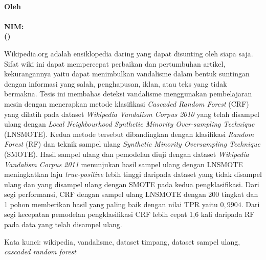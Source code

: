\begin{center}
\textbf{\large
	\MakeUppercase{\judul{}} \\
	\bigskip
	\textnormal{Oleh} \\
	\myname{} \\
	NIM: \mysid{} \\
	(\mydept{}) \\
}
\end{center}

\bigskip
\bigskip
\bigskip

Wikipedia.org adalah ensiklopedia daring yang dapat disunting oleh siapa saja.
Sifat wiki ini dapat mempercepat perbaikan dan pertumbuhan artikel,
kekurangannya yaitu dapat menimbulkan vandalisme dalam bentuk suntingan dengan
informasi yang salah, penghapusan, iklan, atau teks yang tidak bermakna.
Tesis ini membahas deteksi vandalisme menggunakan pembelajaran mesin
dengan menerapkan metode klasifikasi
\textit{Cascaded Random Forest} (CRF)
yang dilatih pada dataset
\textit{Wikipedia Vandalism Corpus 2010}
yang telah
disampel ulang dengan
\textit{Local Neighbourhood Synthetic Minority Over-sampling Technique}
(LNSMOTE).
Kedua metode tersebut dibandingkan dengan klasifikasi
\textit{Random Forest} (RF)
dan teknik sampel ulang
\textit{Synthetic Minority Oversampling Technique} (SMOTE).
Hasil sampel ulang dan pemodelan diuji dengan dataset
\textit{Wikipedia Vandalism Corpus 2011}
menunjukan hasil sampel ulang dengan LNSMOTE meningkatkan laju
\textit{true-positive} lebih tinggi daripada dataset yang tidak disampel ulang
dan yang disampel ulang dengan SMOTE pada kedua pengklasifikasi.
Dari segi performansi, CRF dengan sampel ulang LNSMOTE dengan 200 tingkat dan 1
pohon memberikan hasil yang paling baik dengan nilai TPR yaitu $0,9904$.
Dari segi kecepatan pemodelan pengklasifikasi CRF lebih cepat 1,6 kali daripada
RF pada data yang telah disampel ulang.

Kata kunci: wikipedia, vandalisme, dataset timpang, dataset sampel ulang,
\textit{cascaded random forest}
